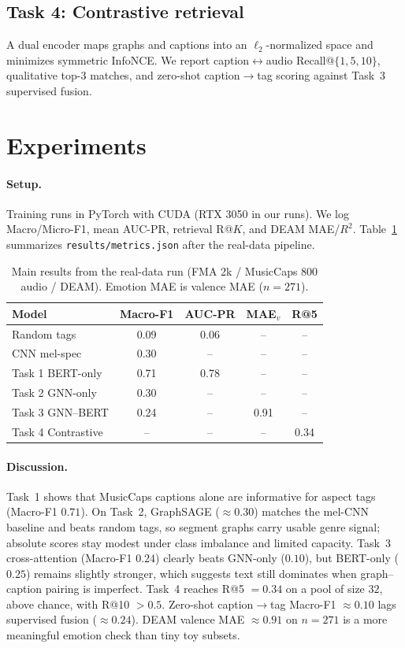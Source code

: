 \documentclass{article}
\begin{document}
\subsection{Task 4: Contrastive retrieval}
A dual encoder maps graphs and captions into an $\ell_2$-normalized space and minimizes symmetric InfoNCE.
We report caption$\leftrightarrow$audio Recall@$\{1,5,10\}$, qualitative top-$3$ matches, and zero-shot caption$\rightarrow$tag scoring against Task~3 supervised fusion.

\section{Experiments}
\label{sec:exp}

\paragraph{Setup.}
Training runs in PyTorch with CUDA (RTX 3050 in our runs).
We log Macro/Micro-F1, mean AUC-PR, retrieval R@$K$, and DEAM MAE/$R^2$.
Table~\ref{tab:main} summarizes \texttt{results/metrics.json} after the real-data pipeline.

\begin{table}[t]
  \caption{Main results from the real-data run (FMA 2k / MusicCaps 800 audio / DEAM). Emotion MAE is valence MAE ($n{=}271$).}
  \label{tab:main}
  \centering
  \begin{tabular}{lcccc}
    \toprule
    Model & Macro-F1 & AUC-PR & MAE$_v$ & R@5 \\
    \midrule
    Random tags & 0.09 & 0.06 & -- & -- \\
    CNN mel-spec & 0.30 & -- & -- & -- \\
    Task 1 BERT-only & 0.71 & 0.78 & -- & -- \\
    Task 2 GNN-only & 0.30 & -- & -- & -- \\
    Task 3 GNN--BERT & 0.24 & -- & 0.91 & -- \\
    Task 4 Contrastive & -- & -- & -- & 0.34 \\
    \bottomrule
  \end{tabular}
\end{table}

\paragraph{Discussion.}
Task~1 shows that MusicCaps captions alone are informative for aspect tags (Macro-F1 $0.71$).
On Task~2, GraphSAGE ($\approx 0.30$) matches the mel-CNN baseline and beats random tags, so segment graphs carry usable genre signal; absolute scores stay modest under class imbalance and limited capacity.
Task~3 cross-attention (Macro-F1 $0.24$) clearly beats GNN-only ($0.10$), but BERT-only ($0.25$) remains slightly stronger, which suggests text still dominates when graph--caption pairing is imperfect.
Task~4 reaches R@5 $=0.34$ on a pool of size $32$, above chance, with R@10 $>0.5$.
Zero-shot caption$\rightarrow$tag Macro-F1 $\approx 0.10$ lags supervised fusion ($\approx 0.24$).
DEAM valence MAE $\approx 0.91$ on $n{=}271$ is a more meaningful emotion check than tiny toy subsets.
\end{document}
